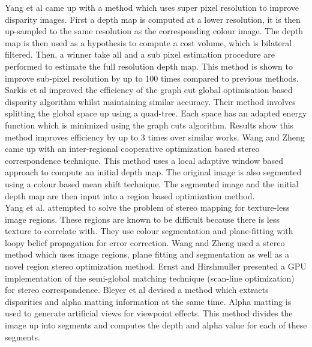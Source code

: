 Yang et al \cite{Yang07Spatial} came up with a method which uses super pixel resolution to improve disparity images. First a depth map is computed at a lower resolution, it is then up-sampled to the same resolution as the corresponding colour image. The depth map is then used as a hypothesis to compute a cost volume, which is bilateral filtered. Then, a winner take all and a sub pixel estimation procedure are performed to estimate the full resolution depth map. This method is shown to improve sub-pixel resolution by up to 100 times compared to previous methods.\\


Sarkis et al \cite{Sarkis07Fast} improved the efficiency of the graph cut global optimisation based disparity algorithm whilst maintaining similar accuracy. Their method involves splitting the global space up using a quad-tree. Each space has an adapted energy function which is minimized using the graph cuts algorithm. Results show this method improves efficiency by up to 3 times over similar works. Wang and Zheng \cite{Wang08Region} came up with an inter-regional cooperative optimization based stereo correspondence technique. This method uses a local adaptive window based approach to compute an initial depth map. The original image is also segmented using a colour based mean shift technique. The segmented image and the initial depth map are then input into a region based optimization method.  \\


Yang et al. \cite{Yang08Near} attempted to solve the problem of stereo mapping for texture-less image regions. These regions are known to be difficult because there is less texture to correlate with. They use colour segmentation and plane-fitting with loopy belief propagation for error correction. Wang and Zheng \cite{Wang08Region} used a stereo method which uses image regions, plane fitting and segmentation as well as a novel region stereo optimization method. Ernst and Hirshmuller \cite{Ernst08Mutual} presented a GPU implementation of the semi-global matching technique (scan-line optimization) for stereo correspondence. Bleyer et al \cite{Bleyer09Stereo} devised a method which extracts disparities and alpha matting information at the same time. Alpha matting is used to generate artificial views for viewpoint effects. This method divides the image up into segments and computes the depth and alpha value for each of these segments. \\


